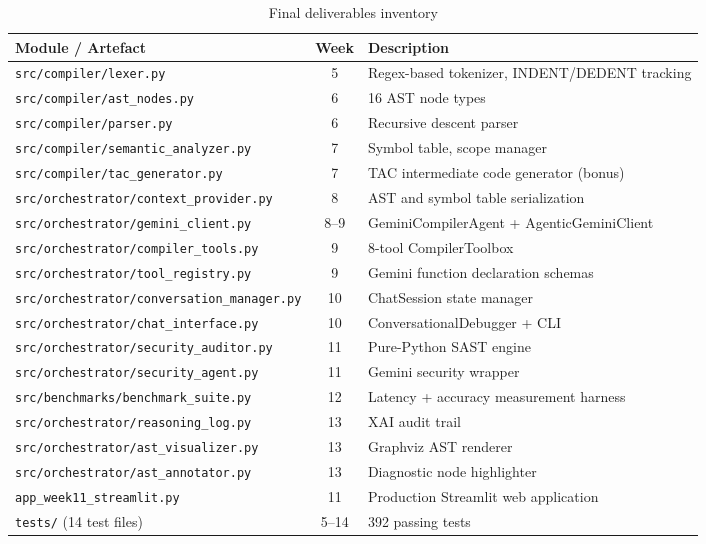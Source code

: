 \documentclass[a4paper,11pt]{article}
\begin{document}
\begin{table}[h]
\centering
\begin{tabularx}{\textwidth}{|l|c|X|}
\hline
\rowcolor{green!10}
\textbf{Module / Artefact} & \textbf{Week} & \textbf{Description} \\
\hline
\texttt{src/compiler/lexer.py} & 5 & Regex-based tokenizer, INDENT/DEDENT tracking \\
\texttt{src/compiler/ast\_nodes.py} & 6 & 16 AST node types \\
\texttt{src/compiler/parser.py} & 6 & Recursive descent parser \\
\texttt{src/compiler/semantic\_analyzer.py} & 7 & Symbol table, scope manager \\
\texttt{src/compiler/tac\_generator.py} & 7 & TAC intermediate code generator (bonus) \\
\texttt{src/orchestrator/context\_provider.py} & 8 & AST and symbol table serialization \\
\texttt{src/orchestrator/gemini\_client.py} & 8--9 & GeminiCompilerAgent + AgenticGeminiClient \\
\texttt{src/orchestrator/compiler\_tools.py} & 9 & 8-tool CompilerToolbox \\
\texttt{src/orchestrator/tool\_registry.py} & 9 & Gemini function declaration schemas \\
\texttt{src/orchestrator/conversation\_manager.py} & 10 & ChatSession state manager \\
\texttt{src/orchestrator/chat\_interface.py} & 10 & ConversationalDebugger + CLI \\
\texttt{src/orchestrator/security\_auditor.py} & 11 & Pure-Python SAST engine \\
\texttt{src/orchestrator/security\_agent.py} & 11 & Gemini security wrapper \\
\texttt{src/benchmarks/benchmark\_suite.py} & 12 & Latency + accuracy measurement harness \\
\texttt{src/orchestrator/reasoning\_log.py} & 13 & XAI audit trail \\
\texttt{src/orchestrator/ast\_visualizer.py} & 13 & Graphviz AST renderer \\
\texttt{src/orchestrator/ast\_annotator.py} & 13 & Diagnostic node highlighter \\
\texttt{app\_week11\_streamlit.py} & 11 & Production Streamlit web application \\
\texttt{tests/} (14 test files) & 5--14 & 392 passing tests \\
\hline
\end{tabularx}
\caption{Final deliverables inventory}
\end{table}
\end{document}
